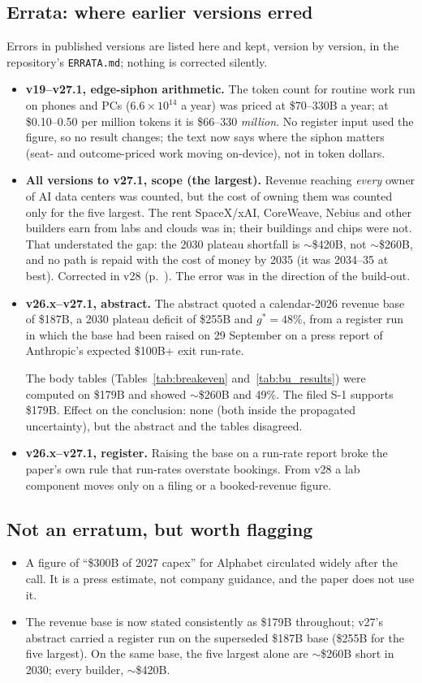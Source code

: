 \documentclass[11pt,letterpaper]{article}
\begin{document}
\subsection*{Errata: where earlier versions erred}\label{ag:errata}
Errors in published versions are listed here and kept, version by version, in the repository's \texttt{ERRATA.md}; nothing is corrected silently.
\begin{itemize}
\item \textbf{v19--v27.1, edge-siphon arithmetic.} The token count for routine work run on phones and PCs ($6.6\times10^{14}$ a year) was priced at \$70--330B a year; at \$0.10--0.50 per million tokens it is \$66--330 \emph{million}. No register input used the figure, so no result changes; the text now says where the siphon matters (seat- and outcome-priced work moving on-device), not in token dollars.
\item \textbf{All versions to v27.1, scope (the largest).} Revenue reaching \emph{every} owner of AI data centers was counted, but the cost of owning them was counted only for the five largest. The rent SpaceX/xAI, CoreWeave, Nebius and other builders earn from labs and clouds was in; their buildings and chips were not. That understated the gap: the 2030 plateau shortfall is $\sim$\$420B, not $\sim$\$260B, and no path is repaid with the cost of money by 2035 (it was 2034--35 at best). Corrected in v28 (p.~\pageref{ag:spacex}). The error was in the direction of the build-out.
\item \textbf{v26.x--v27.1, abstract.} The abstract quoted a calendar-2026 revenue base of \$187B, a 2030 plateau deficit of \$255B and $g^{*}=48\%$, from a register run in which the base had been raised on 29 September on a press report of Anthropic's expected \$100B+ exit run-rate.

The body tables (Tables~\ref{tab:breakeven} and~\ref{tab:bu_results}) were computed on \$179B and showed $\sim$\$260B and 49\%. The filed S-1 supports \$179B. Effect on the conclusion: none (both inside the propagated uncertainty), but the abstract and the tables disagreed.
\item \textbf{v26.x--v27.1, register.} Raising the base on a run-rate report broke the paper's own rule that run-rates overstate bookings. From v28 a lab component moves only on a filing or a booked-revenue figure.
\end{itemize}
\subsection*{Not an erratum, but worth flagging}
\begin{itemize}
\item A figure of ``\$300B of 2027 capex'' for Alphabet circulated widely after the call. It is a press estimate, not company guidance, and the paper does not use it.
\item The revenue base is now stated consistently as \$179B throughout; v27's abstract carried a register run on the superseded \$187B base (\$255B for the five largest). On the same base, the five largest alone are $\sim$\$260B short in 2030; every builder, $\sim$\$420B.
\end{itemize}
\end{document}
